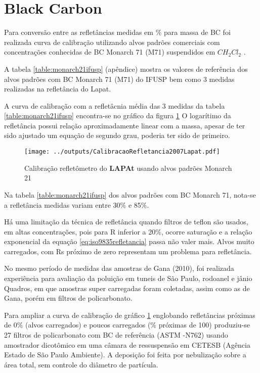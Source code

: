 \section{Black Carbon}

Para conversão entre as refletâncias medidas em \% para massa de BC foi 
realizada curva de calibração utilizando alvos padrões comerciais 
com concentrações conhecidas de BC Monarch 71 (M71) suspendidos em 
$CH_2Cl_2$ \citep{clarke1986}. 

A tabela \ref{table:monarch21ifusp} (apêndice) mostra os valores de referência 
dos alvos padrões com BC Monarch 71 (M71) do IFUSP bem como 3 medidas realizadas 
na refletância do Lapat. 

A curva de calibração com a refletâcnia média das 3 medidas da tabela 
\ref{table:monarch21ifusp} encontra-se no gráfico da figura 
\ref{fig:mocarch21calib}
O logarítimo da refletância possui relação aproximadamente linear com a massa, 
apesar de ter sido ajustado um equação de segundo grau, poderia ter sido de 
primeiro. 

\begin{figure}[H]
  \centering
  \texttt{[image: ../outputs/CalibracaoRefletancia2007Lapat.pdf]}
  \caption{Calibração refletômetro do \textbf{LAPAt} usando alvos padrões Monarch 21
          \label{fig:mocarch21calib}}
\end{figure}

Na tabela \ref{table:monarch21ifusp} dos alvos padrões com BC Monarch 71, 
nota-se a refletância medidas variam entre 30\% e 85\%.

Há uma limitação da técnica de refletância quando filtros de teflon são usados, 
em altas concentrações, pois para R inferior a 20\%, ocorre saturação
e a relação exponencial da equação \ref{eq:iso9835refletancia} 
passa não valer mais\citep{taha2007}. Alvos muito carregados, 
com Rs próximo de zero representam um problema para refletância. 

No mesmo período de medidas das amostras de Gana (2010), foi realizada 
experiência para avaliação da poluição em tuneis de São Paulo, 
rodoanel e jânio Quadros, em que amostras super carregadas foram coletadas, 
assim como as de Gana, porém em filtros de policarbonato.
 
Para ampliar a curva de calibração de gráfico \ref{fig:mocarch21calib} 
englobando refletâncias próximas de 0\% (alvos carregados) e poucos carregados
(\% próximas de 100) produziu-se 27 filtros de policarbonato com
BC de referência (ASTM -N762) usando amostrador dicotômico em uma câmara de 
ressuspensão em CETESB (Agência Estado de São Paulo Ambiente). 
A deposição foi feita por nebulização sobre a área total, 
sem controle do diâmetro de partícula.

